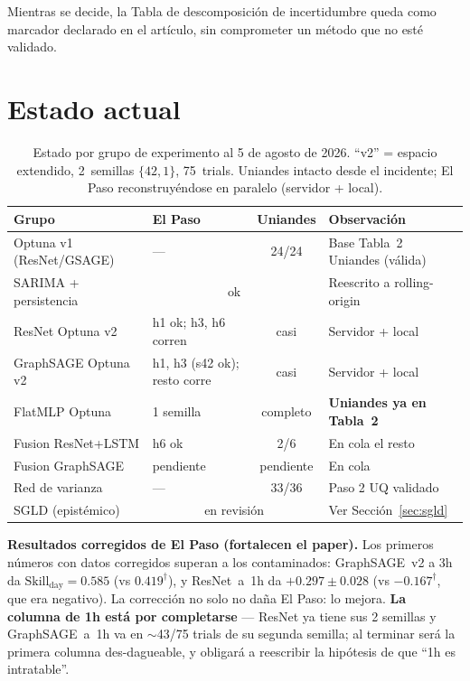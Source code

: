 \documentclass[12pt,a4paper]{article}
\begin{document}
Mientras se decide, la Tabla de descomposición de incertidumbre queda como
marcador declarado en el artículo, sin comprometer un método que no esté
validado.

\section{Estado actual}
\label{sec:estado}

\begin{table}[H]
  \centering
  \small
  \caption{Estado por grupo de experimento al 5 de agosto de 2026.
           ``v2'' = espacio extendido, 2~semillas $\{42,1\}$, 75~trials.
           Uniandes intacto desde el incidente; El Paso reconstruyéndose en
           paralelo (servidor + local).}
  \label{tab:estado}
  \footnotesize
  \begin{tabular}{@{}lp{4.2cm}cp{3.9cm}@{}}
    \toprule
    \textbf{Grupo} & \textbf{El Paso} & \textbf{Uniandes} & \textbf{Observación} \\
    \midrule
    Optuna v1 (ResNet/GSAGE) & ---  & 24/24 & Base Tabla~2 Uniandes (válida) \\
    SARIMA + persistencia    & \multicolumn{2}{c}{ok} & Reescrito a rolling-origin \\
    \midrule
    ResNet Optuna v2    & h1 ok; h3, h6 corren & casi & Servidor + local \\
    GraphSAGE Optuna v2 & h1, h3 (s42 ok); resto corre & casi & Servidor + local \\
    FlatMLP Optuna      & 1 semilla & completo & \textbf{Uniandes ya en Tabla~2} \\
    Fusion ResNet+LSTM  & h6 ok & 2/6 & En cola el resto \\
    Fusion GraphSAGE    & pendiente & pendiente & En cola \\
    Red de varianza     & --- & 33/36 & Paso 2 UQ validado \\
    SGLD (epistémico)   & \multicolumn{2}{c}{en revisión} & Ver Sección~\ref{sec:sgld} \\
    \bottomrule
  \end{tabular}
\end{table}

\textbf{Resultados corregidos de El Paso (fortalecen el paper).} Los primeros
números con datos corregidos superan a los contaminados: GraphSAGE~v2 a 3h da
$\text{Skill}_\text{day} = 0.585$ (vs $0.419^\dagger$), y ResNet~a~1h da
$+0.297 \pm 0.028$ (vs $-0.167^\dagger$, que era negativo). La corrección no
solo no daña El Paso: lo mejora. \textbf{La columna de 1h está por completarse}
--- ResNet ya tiene sus 2 semillas y GraphSAGE~a~1h va en $\sim$43/75 trials
de su segunda semilla; al terminar será la primera columna des-dagueable, y
obligará a reescribir la hipótesis de que ``1h es intratable''.
\end{document}
